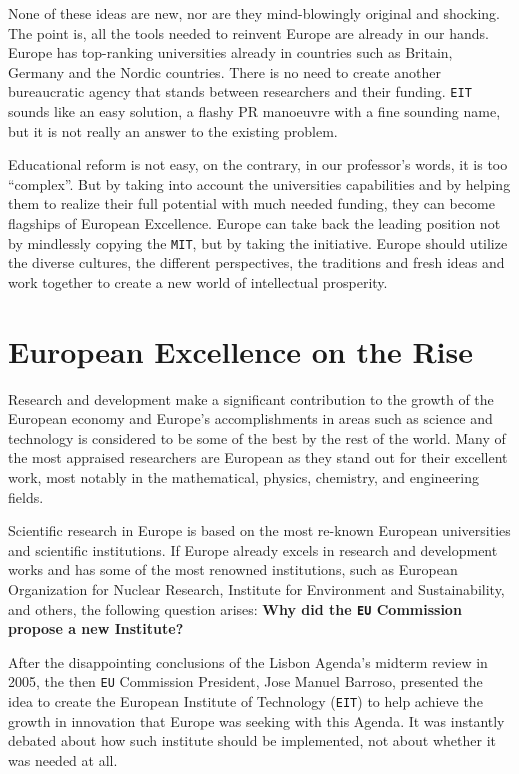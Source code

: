 \documentclass[11pt,a4paper,oneside,twocolumn]{IEEEtran}
\begin{document}
None of these ideas are new, nor are they mind-blowingly original and shocking. The point is, all the tools needed to reinvent Europe are already in our hands. Europe has top-ranking universities already in countries such as Britain, Germany and the Nordic countries\cite{5_2}. There is no need to create another bureaucratic agency that stands between researchers and their funding. \texttt{EIT} sounds like an easy solution, a flashy PR manoeuvre with a fine sounding name, but it is not really an answer to the existing problem.

Educational reform is not easy, on the contrary, in our professor's words, it is too ``complex''. But by taking into account the universities capabilities and by helping them to realize their full potential with much needed funding, they can become flagships of European Excellence.
Europe can take back the leading position not by mindlessly copying the \texttt{MIT}, but by taking the initiative. Europe should utilize the diverse cultures, the different perspectives, the traditions and fresh ideas and work together to create a new world of intellectual prosperity.

\section{European Excellence on the Rise}
Research and development make a significant contribution to the growth of the European economy and Europe's accomplishments in areas such as science and technology is considered to be some of the best by the rest of the world. Many of the most appraised researchers are European as they stand out for their excellent work, most notably in the mathematical, physics, chemistry, and engineering fields.

Scientific research in Europe is based on the most re-known European universities and scientific institutions. If Europe already excels in research and development works and has some of the most renowned institutions, such as European Organization for Nuclear Research, Institute for Environment and Sustainability, and others, the following question arises: \textbf{Why did the \texttt{EU} Commission propose a new Institute?}

After the disappointing conclusions of the Lisbon Agenda's midterm review in 2005, the then \texttt{EU} Commission President, Jose Manuel Barroso, presented the idea to create the European Institute of Technology (\texttt{EIT}) to help achieve the growth in innovation that Europe was seeking with this Agenda. It was instantly debated about how such institute should be implemented, not about whether it was needed at all.
\end{document}
